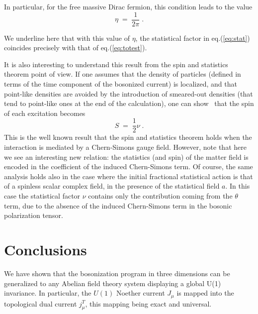 \documentclass[a4paper,12pt]{article}
\begin{document}
In particular, for the free massive Dirac fermion, this condition
leads to the value
\begin{equation}
\eta \;=\; \frac{1}{2\pi}\;.
\end{equation}

We underline here that with this value of $\eta$, the statistical factor
in eq.(\ref{eq:stat}) coincides precisely with that of
eq.(\ref{eq:totest}).


It is also interesting to understand this result from the spin and
statistics theorem point of view. If one assumes that the density of
particles (defined in terms of the time component of the bosonized
current) is localized, and that point-like densities are avoided by
the introduction of smeared-out densities (that tend to point-like
ones at the end of the calculation), one can show~\cite{lerda} that
the spin of each excitation becomes
\begin{equation}
  \label{eq:spin}
  S \;=\; \frac{1}{2} \nu \;.
\end{equation}
This is the well known result that the spin and statistics theorem
holds when the interaction is mediated by a Chern-Simons gauge field.
However, note that here we see an interesting new relation: the
statistics (and spin) of the matter field is encoded in the
coefficient of the induced Chern-Simons term. Of course, the same
analysis holds also in the case where the initial fractional
statistical action is that of a spinless scalar complex field, in the
presence of the statistical field $a$. In this case the statistical
factor $\nu$ contains only the contribution coming from the $\theta$ term,
due to the absence of the induced Chern-Simons term in the bosonic
polarization tensor.


\section{Conclusions}\label{concl}
We have shown that the bosonization program in three dimensions can be
generalized to any Abelian field theory system displaying a global
U(1) invariance. In particular, the $U(1)$ Noether current $J_\mu$ is
mapped into the topological dual current $j^T_\mu$, this mapping being
exact and universal.
\end{document}
